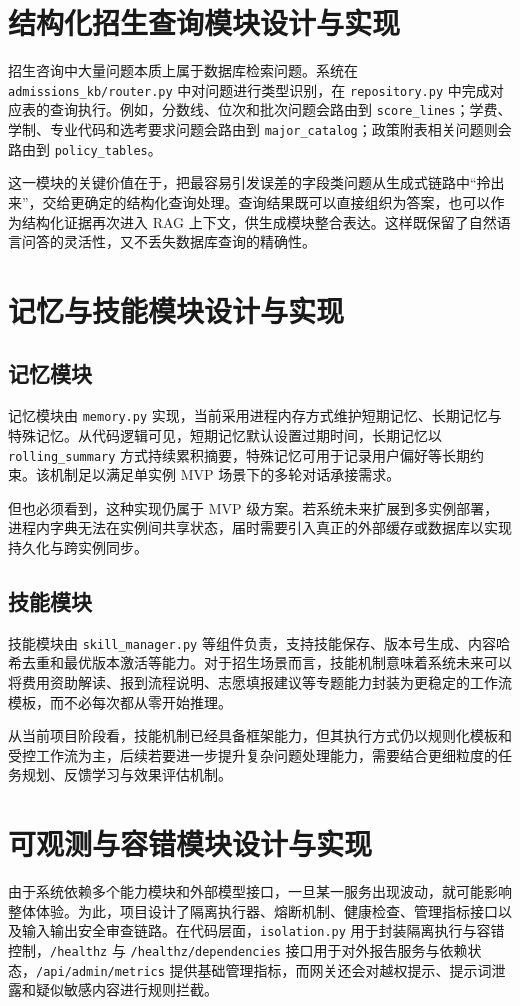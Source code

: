 \documentclass[UTF8,zihao=-4,oneside,fontset=windows]{ctexbook}
\numberwithin{equation}{chapter}
\begin{document}
\section{结构化招生查询模块设计与实现}
招生咨询中大量问题本质上属于数据库检索问题。系统在 \texttt{admissions\_kb/router.py} 中对问题进行类型识别，在 \texttt{repository.py} 中完成对应表的查询执行\cite{projectanalysis}。例如，分数线、位次和批次问题会路由到 \texttt{score\_lines}；学费、学制、专业代码和选考要求问题会路由到 \texttt{major\_catalog}；政策附表相关问题则会路由到 \texttt{policy\_tables}。

这一模块的关键价值在于，把最容易引发误差的字段类问题从生成式链路中“拎出来”，交给更确定的结构化查询处理。查询结果既可以直接组织为答案，也可以作为结构化证据再次进入 RAG 上下文，供生成模块整合表达。这样既保留了自然语言问答的灵活性，又不丢失数据库查询的精确性。

\section{记忆与技能模块设计与实现}
\subsection{记忆模块}
记忆模块由 \texttt{memory.py} 实现，当前采用进程内存方式维护短期记忆、长期记忆与特殊记忆\cite{projectanalysis}。从代码逻辑可见，短期记忆默认设置过期时间，长期记忆以 \texttt{rolling\_summary} 方式持续累积摘要，特殊记忆可用于记录用户偏好等长期约束。该机制足以满足单实例 MVP 场景下的多轮对话承接需求。

但也必须看到，这种实现仍属于 MVP 级方案。若系统未来扩展到多实例部署，进程内字典无法在实例间共享状态，届时需要引入真正的外部缓存或数据库以实现持久化与跨实例同步。

\subsection{技能模块}
技能模块由 \texttt{skill\_manager.py} 等组件负责，支持技能保存、版本号生成、内容哈希去重和最优版本激活等能力\cite{projectanalysis}。对于招生场景而言，技能机制意味着系统未来可以将费用资助解读、报到流程说明、志愿填报建议等专题能力封装为更稳定的工作流模板，而不必每次都从零开始推理。

从当前项目阶段看，技能机制已经具备框架能力，但其执行方式仍以规则化模板和受控工作流为主，后续若要进一步提升复杂问题处理能力，需要结合更细粒度的任务规划、反馈学习与效果评估机制。

\section{可观测与容错模块设计与实现}
由于系统依赖多个能力模块和外部模型接口，一旦某一服务出现波动，就可能影响整体体验。为此，项目设计了隔离执行器、熔断机制、健康检查、管理指标接口以及输入输出安全审查链路\cite{projectanalysis}。在代码层面，\texttt{isolation.py} 用于封装隔离执行与容错控制，\texttt{/healthz} 与 \texttt{/healthz/dependencies} 接口用于对外报告服务与依赖状态，\texttt{/api/admin/metrics} 提供基础管理指标，而网关还会对越权提示、提示词泄露和疑似敏感内容进行规则拦截。
\end{document}

